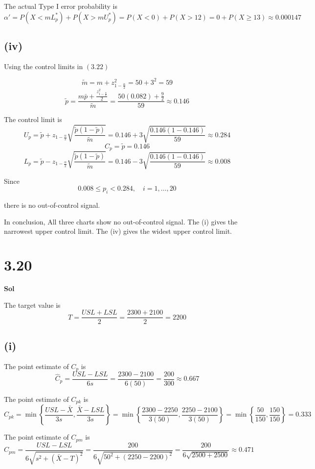 \documentclass[a4paper, 12pt]{article}  %
\begin{document}
The actual Type I error probability is
$$
\alpha'=P(X<mL_p^*)+P(X>mU_p^*)=P(X<0)+P(X>12)=0+P(X\ge 13)\approx 0.000147
$$

\subsection*{(iv)}

Using the control limits in \((3.22)\)

$$
\tilde m=m+z_{1-\frac{\alpha}{2}}^2=50+3^2=59
$$
$$
\tilde p=\frac{m\bar p+\frac{z_{1-\frac{\alpha}{2}}^2}{2}}{\tilde m}=\frac{50(0.082)+\frac{9}{2}}{59}\approx 0.146
$$

The control limit is
$$
U_p=\tilde p+z_{1-\frac{\alpha}{2}}\sqrt{\frac{\tilde p(1-\tilde p)}{\tilde m}}=0.146+3\sqrt{\frac{0.146(1-0.146)}{59}}\approx 0.284
$$
$$
C_p=\tilde p=0.146
$$
$$
L_p=\tilde p-z_{1-\frac{\alpha}{2}}\sqrt{\frac{\tilde p(1-\tilde p)}{\tilde m}}=0.146-3\sqrt{\frac{0.146(1-0.146)}{59}}\approx 0.008
$$

Since
$$
0.008\le p_i<0.284,\quad i=1,\ldots,20
$$

there is no out-of-control signal.

In conclusion, 
All three charts show no out-of-control signal.
The (i) gives the narrowest upper control limit.
The (iv) gives the widest upper control limit.

\section*{3.20}
\textbf{Sol}

The target value is
$$
T=\frac{USL+LSL}{2}
=
\frac{2300+2100}{2}
=
2200
$$

\subsection*{(i)}

The point estimate of \(C_p\) is
$$
\hat C_p
=
\frac{USL-LSL}{6s}
=
\frac{2300-2100}{6(50)}
=
\frac{200}{300}
\approx 0.667
$$

The point estimate of \(C_{pk}\) is
$$
\hat C_{pk}
=
\min\left\{
\frac{USL-\bar X}{3s},
\frac{\bar X-LSL}{3s}
\right\}
=
\min\left\{
\frac{2300-2250}{3(50)},
\frac{2250-2100}{3(50)}
\right\}
=
\min\left\{
\frac{50}{150},
\frac{150}{150}
\right\}
=
0.333
$$

The point estimate of \(C_{pm}\) is
$$
\hat C_{pm}
=
\frac{USL-LSL}
{6\sqrt{s^2+(\bar X-T)^2}}
=
\frac{200}
{6\sqrt{50^2+(2250-2200)^2}}
=
\frac{200}
{6\sqrt{2500+2500}}
\approx 0.471
$$
\end{document}
